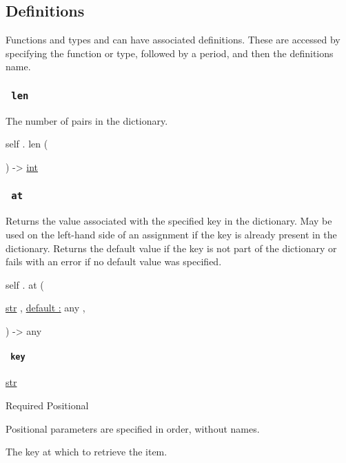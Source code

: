 \subsection{\texorpdfstring{{ Definitions
}}{ Definitions }}\label{definitions}

\label{definitions-tooltip}
Functions and types and can have associated definitions. These are
accessed by specifying the function or type, followed by a period, and
then the definition\textquotesingle s name.

\subsubsection{\texorpdfstring{\texttt{\ len\ }}{ len }}\label{definitions-len}

The number of pairs in the dictionary.

self { . } { len } (

) -\textgreater{} \href{/docs/reference/foundations/int/}{int}

\subsubsection{\texorpdfstring{\texttt{\ at\ }}{ at }}\label{definitions-at}

Returns the value associated with the specified key in the dictionary.
May be used on the left-hand side of an assignment if the key is already
present in the dictionary. Returns the default value if the key is not
part of the dictionary or fails with an error if no default value was
specified.

self { . } { at } (

{ \href{/docs/reference/foundations/str/}{str} , } {
\hyperref[definitions-at-parameters-default]{default :} { any } , }

) -\textgreater{} { any }

\paragraph{\texorpdfstring{\texttt{\ key\ }}{ key }}\label{definitions-at-key}

\href{/docs/reference/foundations/str/}{str}

{Required} {{ Positional }}

\label{definitions-at-key-positional-tooltip}
Positional parameters are specified in order, without names.

The key at which to retrieve the item.


